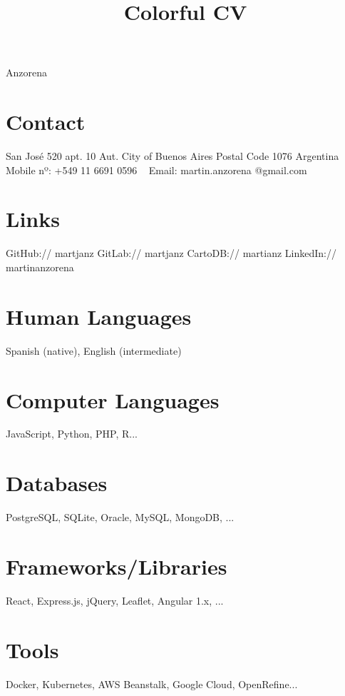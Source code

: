 \documentclass[]{cv-style}          %
\begin{document}
\title{Colorful CV}

 {Anzorena}           %
\lastupdated


\begin{aside}
%
\section{Contact}
San José 520 apt. 10
Aut. City of Buenos Aires
Postal Code 1076
Argentina
~
Mobile nº:
+549 11 6691 0596
~
Email:
martin.anzorena
@gmail.com
%
\section{Links} 
GitHub:// martjanz
GitLab:// martjanz
CartoDB:// martianz
LinkedIn:// martinanzorena
%
\section{Human
Languages}
Spanish (native),
English (intermediate)
%
\section{Computer
   Languages}
JavaScript, Python,
PHP, R...
%
\section{Databases}
PostgreSQL, SQLite,
Oracle, MySQL, 
MongoDB, ...
%
\section{Frameworks/Libraries}
React, Express.js,
jQuery, Leaflet,
Angular 1.x, ... 
%
\section{Tools}
Docker,
Kubernetes,
AWS Beanstalk,
Google Cloud,
OpenRefine...
%
\end{aside}


{\vspace{+0.4cm}}
\end{document}
